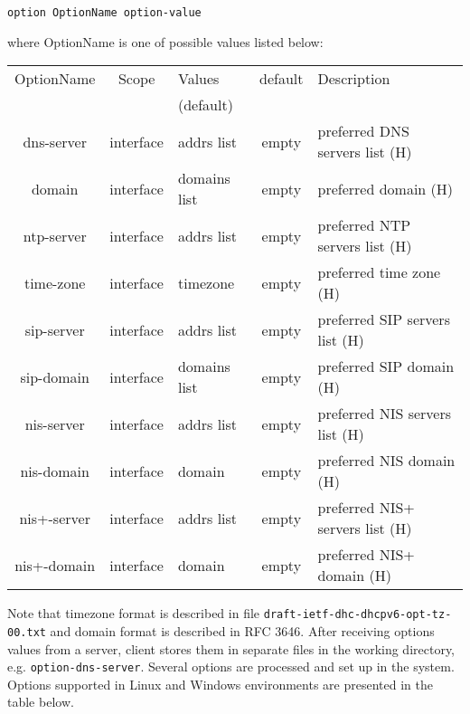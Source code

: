 \begin{verbatim}
option OptionName option-value
\end{verbatim}

where OptionName is one of possible values listed below:

\begin{center}
\begin{tabular}{|c|c|>{\centering}p{1.7cm}<{}|c|p{6cm}|}
\hline
OptionName     & Scope    & Values      &default& Description \\
               &          & (default)   &       & \\
\hline
dns-server     & interface& addrs list  & empty & preferred DNS servers list (H) \\
domain         & interface&domains list & empty & preferred domain (H)\\
ntp-server     & interface& addrs list  & empty & preferred NTP servers list (H)\\
time-zone      & interface& timezone    & empty & preferred time zone (H)\\
sip-server     & interface& addrs list  & empty & preferred SIP servers list (H)\\
sip-domain     & interface&domains list & empty & preferred SIP domain (H)\\
nis-server     & interface& addrs list  & empty & preferred NIS servers list (H)\\
nis-domain     & interface& domain      & empty & preferred NIS domain (H)\\
nis+-server    & interface& addrs list  & empty & preferred NIS+ servers list (H)\\
nis+-domain    & interface& domain      & empty & preferred NIS+ domain (H)\\
\hline
\end{tabular}
\end{center}

Note that timezone format is described in file \verb+draft-ietf-dhc-dhcpv6-opt-tz-00.txt+
and domain format is described in RFC 3646. After receiving options
values from a server, client stores them in separate files in the
working directory, e.g. \verb+option-dns-server+. Several options
are processed and set up in the system. Options supported in Linux and
Windows environments are presented in the table below.


